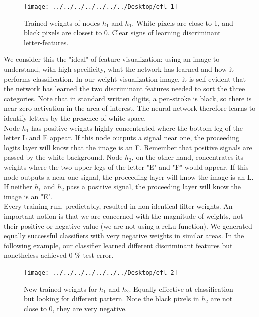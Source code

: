 \documentclass[12pt]{article}
\begin{document}
\begin{figure}[h]
\centering
\texttt{[image: ../../../../../../../Desktop/efl\_1]}
\caption{Trained weights of nodes $h_1$ and $h_1$. White pixels are close to 1, and black pixels are closest to 0. Clear signs of learning discriminant letter-features.}
\label{fig:efl1}
\end{figure}

We consider this the "ideal" of feature visualization: using an image to understand, with high specificity, what the network has learned and how it performs classification. In our weight-visualization image, it is self-evident that the network has learned the two discriminant features needed to sort the three categories. Note that in standard written digits, a pen-stroke is black, so there is near-zero activation in the area of interest. The neural network therefore learns to identify letters by the presence of white-space.\\ 

Node $h_1$ has positive weights highly concentrated where the bottom leg of the letter L and E appear. If this node outputs a signal near one, the proceeding logits layer will know that the image is an F. Remember that positive signals are passed by the white background. Node $h_2$, on the other hand, concentrates its weights where the two upper legs of the letter "E" and "F" would appear. If this node outputs a near-one signal, the proceeding layer will know the image is an L. If neither $h_1$ and $h_2$ pass a positive signal, the proceeding layer will know the image is an "E". \\

Every training run, predictably, resulted in non-identical filter weights. An important notion is that we are concerned with the magnitude of weights, not their positive or negative value (we are not using a reLu function). We generated equally successful classifiers with very negative weights in similar areas. In the following example, our classifier learned different discriminant features but nonetheless achieved 0 \% test error.

\begin{figure}[h]
	\centering
	\texttt{[image: ../../../../../../../Desktop/efl\_2]}
	\caption{New trained weights for $h_1$ and $h_2$. Equally effective at classification but looking for different pattern. Note the black pixels in $h_2$ are not close to 0, they are very negative.}
	\label{fig:efl2}
\end{figure}
\end{document}
